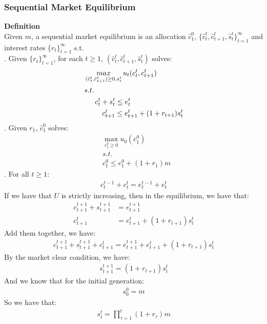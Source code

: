 \documentclass{article}
\begin{document}
\subsubsection{Sequential Market Equilibrium}
\textbf{Definition}\\
Given $m$, a sequential market equilibrium is an allocation $\hat{c}^0_1$, $\{\hat{c}^t_t, \hat{c}^t_{t+1}, \hat{s}^t_t\}^\infty_{t=1}$ and interest rates $\{r_t\}^\infty_{t=1}$ s.t.\\
. Given $\{r_t\}^\infty_{t=1}$, for each $t \geq 1$, $(\hat{c}^t_t, \hat{c}^t_{t+1}, \hat{s}^t_t )$ solves:
\begin{align*}
	&\mathop{max}\limits_{(\hat{c}^t_t, \hat{c}^t_{t+1}) \geq 0, s^t_t} u_t(c^t_t, c^t_{t+1})\\
	&s.t.\\
	&\indent c^t_t + s^t_t \leq e^t_t\\
	&\indent\ \ \  c^t_{t+1} \leq e^t_{t+1} + (1 + r_{t+1}) s^t_t  
\end{align*}
. Given $r_1$, $\hat{c}^0_1$ solves:
\begin{align*}
	&\mathop{max}\limits_{c^0_1 \geq 0} u_0(c^0_1)\\
	&s.t.\\
	&c^0_1 \leq e^0_1 + (1 + r_1)m
\end{align*}
. For all $t \geq 1$:
	\begin{align*}
		c^{t-1}_t + c^t_t = e^{t-1}_t + e^t_t
	\end{align*}
If we have that $U$ is strictly increasing, then in the equilibrium, we have that:
	\begin{align*}
		c^{t+1}_{t+1} + s^{t+1}_{t+1} &= e^{t+1}_{t+1}\\
		c^{t}_{t+1} &= e^t_{t+1} + (1 + r_{t+1}) s^t_t  
	\end{align*}
Add them together, we have:
	\begin{align*}
		c^{t+1}_{t+1} + s^{t+1}_{t+1} + c^{t}_{t+1} = e^{t+1}_{t+1} + e^t_{t+1} + (1 + r_{t+1}) s^t_t
	\end{align*}
By the market clear condition, we have:
	\begin{align*}
		s^{t+1}_{t+1} = (1 + r_{t+1}) s^t_t
	\end{align*}
And we know that for the initial generation:
	\begin{align*}
		s^0_0 = m
	\end{align*}
So we have that:
	\begin{align*}
		s^t_t = \prod\limits^t_{\tau=1} (1 + r_{\tau}) m
	\end{align*}
\end{document}
